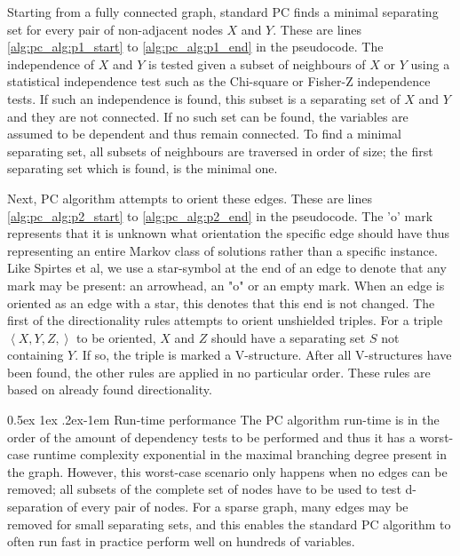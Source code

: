 \documentclass[a4paper, 10pt, english, onecolumn]{article}
\makeatletter
\renewcommand{\paragraph}{%
  \@startsection{paragraph}{4}%
  {\z@}{0.5ex \@plus 1ex \@minus .2ex}{-1em}%
  {\normalfont\normalsize\bfseries}%
}
\makeatother
\begin{document}

Starting from a fully connected graph, standard PC finds a minimal separating set for every pair of non-adjacent nodes $X$ and $Y$.
These are lines \ref{alg:pc_alg:p1_start} to \ref{alg:pc_alg:p1_end} in the pseudocode.
The independence of $X$ and $Y$ is tested given a subset of neighbours of $X$ or $Y$ using a statistical independence test such as the Chi-square or Fisher-Z independence tests. %
If such an independence is found, this subset is a separating set of $X$ and $Y$ and they are not connected.
If no such set can be found, the variables are assumed to be dependent and thus remain connected.
To find a minimal separating set, all subsets of neighbours are traversed in order of size; the first separating set which is found, is the minimal one.

Next, PC algorithm attempts to orient these edges.
These are lines \ref{alg:pc_alg:p2_start} to \ref{alg:pc_alg:p2_end} in the pseudocode.
The 'o' mark represents that it is unknown what orientation the specific edge should have thus representing an entire Markov class of solutions rather than a specific instance.
Like Spirtes et al, we use a star-symbol at the end of an edge to denote that any mark may be present: an arrowhead, an "o" or an empty mark.
When an edge is oriented as an edge with a star, this denotes that this end is not changed.
The first of the directionality rules attempts to orient unshielded triples.
For a triple $\left < X,Y,Z, \right>$ to be oriented, $X$ and $Z$ should have a separating set $S$ not containing $Y$.
If so, the triple is marked a V-structure.
After all V-structures have been found, the other rules are applied in no particular order.
These rules are based on already found directionality.

\paragraph{Run-time performance}
The PC algorithm run-time is in the order of the amount of dependency tests to be performed and thus it has a worst-case runtime complexity exponential in the maximal branching degree present in the graph.
However, this worst-case scenario only happens when no edges can be removed; all subsets of the complete set of nodes have to be used to test d-separation of every pair of nodes.
For a sparse graph, many edges may be removed for small separating sets, and this enables the standard PC algorithm to often run fast in practice perform well on hundreds of variables. %
\end{document}
